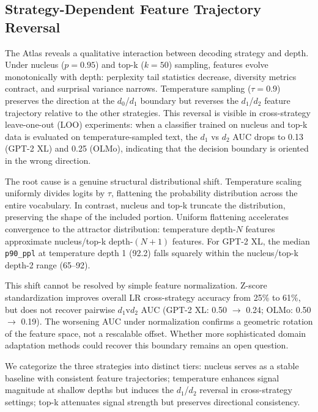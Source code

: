 \documentclass[11pt,a4paper]{article}
\begin{document}
\subsection{Strategy-Dependent Feature Trajectory Reversal}
\label{sec:reversal}

The Atlas reveals a qualitative interaction between decoding strategy and depth. Under nucleus ($p=0.95$) and top-k ($k=50$) sampling, features evolve monotonically with depth: perplexity tail statistics decrease, diversity metrics contract, and surprisal variance narrows. Temperature sampling ($\tau=0.9$) preserves the direction at the $d_0$/$d_1$ boundary but reverses the $d_1$/$d_2$ feature trajectory relative to the other strategies. This reversal is visible in cross-strategy leave-one-out (LOO) experiments: when a classifier trained on nucleus and top-k data is evaluated on temperature-sampled text, the $d_1$ vs $d_2$ AUC drops to 0.13 (GPT-2 XL) and 0.25 (OLMo), indicating that the decision boundary is oriented in the wrong direction.

The root cause is a genuine structural distributional shift. Temperature scaling uniformly divides logits by $\tau$, flattening the probability distribution across the entire vocabulary. In contrast, nucleus and top-k truncate the distribution, preserving the shape of the included portion. Uniform flattening accelerates convergence to the attractor distribution: temperature depth-$N$ features approximate nucleus/top-k depth-$(N{+}1)$ features. For GPT-2 XL, the median \texttt{p90\_ppl} at temperature depth 1 (92.2) falls squarely within the nucleus/top-k depth-2 range (65--92).

This shift cannot be resolved by simple feature normalization. Z-score standardization improves overall LR cross-strategy accuracy from 25\% to 61\%, but does not recover pairwise $d_1$v$d_2$ AUC (GPT-2 XL: 0.50 $\to$ 0.24; OLMo: 0.50 $\to$ 0.19). The worsening AUC under normalization confirms a geometric rotation of the feature space, not a rescalable offset. Whether more sophisticated domain adaptation methods could recover this boundary remains an open question.

We categorize the three strategies into distinct tiers: nucleus serves as a stable baseline with consistent feature trajectories; temperature enhances signal magnitude at shallow depths but induces the $d_1$/$d_2$ reversal in cross-strategy settings; top-k attenuates signal strength but preserves directional consistency.

\end{document}
